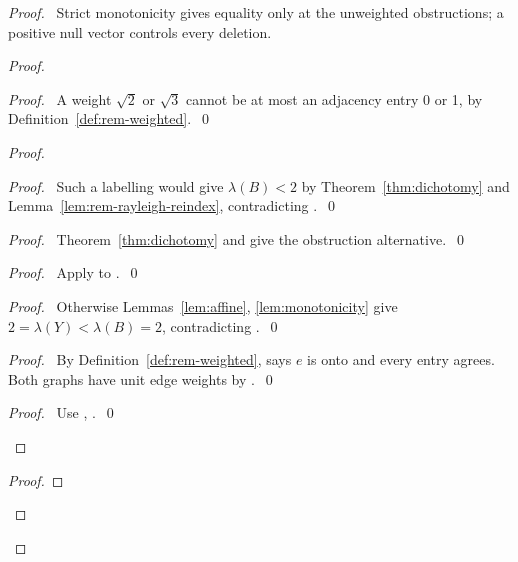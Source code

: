 \begin{proof}
\pfsketch\ Strict monotonicity gives equality only at the unweighted
obstructions; a positive null vector controls every deletion.
\begin{proof}
\begin{proof}\pf\ A weight $\sqrt2$ or $\sqrt3$ cannot be at most an
adjacency entry 0 or 1, by Definition~\ref{def:rem-weighted}.~\qed\end{proof}
\begin{proof}
\begin{proof}\pf\ Such a labelling would give $\lambda(B)<2$ by
Theorem~\ref{thm:dichotomy} and Lemma~\ref{lem:rem-rayleigh-reindex},
contradicting .~\qed\end{proof}
\begin{proof}\pf\ Theorem~\ref{thm:dichotomy} and
 give the obstruction alternative.~\qed\end{proof}
\begin{proof}\pf\ Apply  to .~\qed\end{proof}
\begin{proof}\pf\ Otherwise Lemmas~\ref{lem:affine}, \ref{lem:monotonicity}
give $2=\lambda(Y)<\lambda(B)=2$, contradicting .~\qed\end{proof}
\begin{proof}\pf\ By Definition~\ref{def:rem-weighted},
 says $e$ is onto and every entry agrees.
Both graphs have unit edge weights by .~\qed\end{proof}
\qedstep
\begin{proof}\pf\ Use , .~\qed\end{proof}
\end{proof}
\begin{proof}

\end{proof}
\end{proof}
\end{proof}
